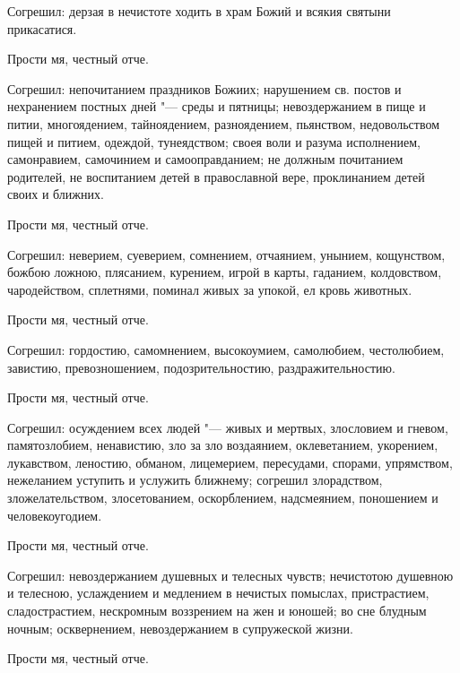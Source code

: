 \begin{mymulticols}
Согрешил: дерзая в нечистоте ходить в храм Божий и всякия святыни прикасатися. 



Прости мя, честный отче. 



Согрешил: непочитанием праздников Божиих; нарушением св. постов и нехранением постных дней "--- среды и пятницы; невоздержанием в пище и питии, многоядением, тайноядением, разноядением, пьянством, недовольством пищей и питием, одеждой, тунеядством; своея воли и разума исполнением, самонравием, самочинием и самооправданием; не должным почитанием родителей, не воспитанием детей в православной вере, проклинанием детей своих и ближних. 



Прости мя, честный отче. 



Согрешил: неверием, суеверием, сомнением, отчаянием, унынием, кощунством, божбою ложною, плясанием, курением, игрой в карты, гаданием, колдовством, чародейством, сплетнями, поминал живых за упокой, ел кровь животных. 



Прости мя, честный отче. 



Согрешил: гордостию, самомнением, высокоумием, самолюбием, честолюбием, завистию, превозношением, подозрительностию, раздражительностию. 



Прости мя, честный отче. 



Согрешил: осуждением всех людей "--- живых и мертвых, злословием и гневом, памятозлобием, ненавистию, зло за зло воздаянием, оклеветанием, укорением, лукавством, леностию, обманом, лицемерием, пересудами, спорами, упрямством, нежеланием уступить и услужить ближнему; согрешил злорадством, зложелательством, злосетованием, оскорблением, надсмеянием, поношением и человекоугодием. 



Прости мя, честный отче. 



Согрешил: невоздержанием душевных и телесных чувств; нечистотою душевною и телесною, услаждением и медлением в нечистых помыслах, пристрастием, сладострастием, нескромным воззрением на жен и юношей; во сне блудным ночным; осквернением, невоздержанием в супружеской жизни. 



Прости мя, честный отче. 




\end{mymulticols}
